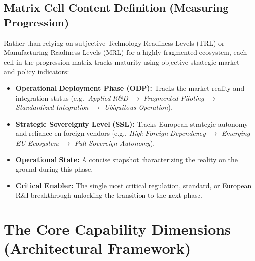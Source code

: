 \documentclass[12pt,a4paper]{article}
\begin{document}
\subsection*{Matrix Cell Content Definition (Measuring Progression)}
Rather than relying on subjective Technology Readiness Levels (TRL) or Manufacturing Readiness Levels (MRL) for a highly fragmented ecosystem, each cell in the progression matrix tracks maturity using objective strategic market and policy indicators:

\begin{itemize}
    \item \textbf{Operational Deployment Phase (ODP):} Tracks the market reality and integration status (e.g., \textit{Applied R\&D $\rightarrow$ Fragmented Piloting $\rightarrow$ Standardized Integration $\rightarrow$ Ubiquitous Operation}).
    \item \textbf{Strategic Sovereignty Level (SSL):} Tracks European strategic autonomy and reliance on foreign vendors (e.g., \textit{High Foreign Dependency $\rightarrow$ Emerging EU Ecosystem $\rightarrow$ Full Sovereign Autonomy}).
    \item \textbf{Operational State:} A concise snapshot characterizing the reality on the ground during this phase.
    \item \textbf{Critical Enabler:} The single most critical regulation, standard, or European R\&I breakthrough unlocking the transition to the next phase.
\end{itemize}


\section{The Core Capability Dimensions (Architectural Framework)}
\end{document}
